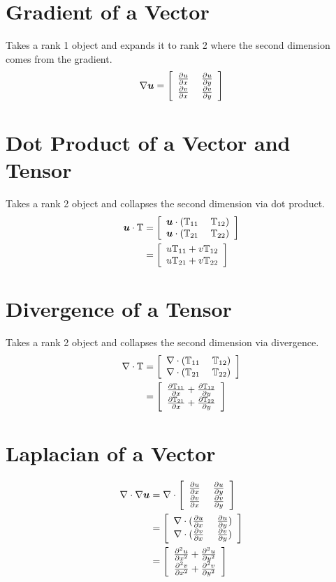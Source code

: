 \documentclass{article}
\begin{document}
\section*{Gradient of a Vector}
Takes a rank 1 object and expands it to rank 2 where the second dimension comes from the gradient.
\begin{equation*}
	\nabla\boldsymbol u=\left[ \begin{array}{cc} \frac{\partial u}{\partial x}\; & \frac{\partial u}{\partial y}\\ \frac{\partial v}{\partial x}\; & \frac{\partial v}{\partial y}\\ \end{array} \right]
\end{equation*}
\section*{Dot Product of a Vector and Tensor}
Takes a rank 2 object and collapses the second dimension via dot product.
\begin{align*}
\boldsymbol u\cdot\mathbb{T}&=\left[ \begin{array}{cc} \boldsymbol u\cdot(\mathbb{T}_{11}\; & \mathbb{T}_{12})\\ \boldsymbol u\cdot(\mathbb{T}_{21}\; & \mathbb{T}_{22})\\ \end{array} \right]\\
&=\left[ \begin{array}{c} u\mathbb{T}_{11}+v\mathbb{T}_{12}\\ u\mathbb{T}_{21}+v\mathbb{T}_{22}\\ \end{array} \right]
\end{align*}
\section*{Divergence of a Tensor}
Takes a rank 2 object and collapses the second dimension via divergence.
\begin{align*}
	\nabla\cdot\mathbb{T}&=\left[ \begin{array}{cc} \nabla\cdot(\mathbb{T}_{11}\; & \mathbb{T}_{12})\\ \nabla\cdot(\mathbb{T}_{21}\; & \mathbb{T}_{22})\\ \end{array} \right]\\
	&=\left[ \begin{array}{c} \frac{\partial\mathbb{T}_{11}}{\partial x}+\frac{\partial\mathbb{T}_{12}}{\partial y}\\ \frac{\partial\mathbb{T}_{21}}{\partial x}+\frac{\partial\mathbb{T}_{22}}{\partial y}\\ \end{array} \right]
\end{align*}
\section*{Laplacian of a Vector}
\begin{align*}
\nabla\cdot\nabla\boldsymbol u&=\nabla\cdot
\left[ \begin{array}{cc} \frac{\partial u}{\partial x}\; & \frac{\partial u}{\partial y}\\ \frac{\partial v}{\partial x}\; & \frac{\partial v}{\partial y}\\ \end{array} \right]\\
&=\left[
\begin{array}{cc}
\nabla\cdot(\frac{\partial u}{\partial x}\; & \frac{\partial u}{\partial y}) \\
\nabla\cdot(\frac{\partial v}{\partial x}\; & \frac{\partial v}{\partial y}) \\
\end{array}
\right]\\
&=\left[ \begin{array}{c} \frac{\partial^2 u}{\partial x^2}+\frac{\partial^2 u}{\partial y^2}\\ \frac{\partial^2 v}{\partial x^2}+\frac{\partial^2 v}{\partial y^2}\\ \end{array} \right]
\end{align*}
\end{document}
